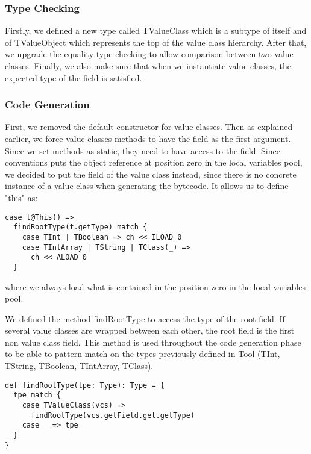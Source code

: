 \subsubsection{Type Checking}
Firstly, we defined a new type called TValueClass which is a subtype of itself and of TValueObject which represents the top of the value class hierarchy. \newline
After that, we upgrade the equality type checking to allow comparison between two value classes. \newline
Finally, we also make sure that when we instantiate value classes, the expected type of the field is satisfied. \newline

\subsubsection{Code Generation}
First, we removed the default constructor for value classes. 
Then as explained earlier, we force value classes methods to have the field as the first argument. 
Since we set methods as static, they need to have access to the field. \newline
Since conventions puts the object reference at position zero in the local variables pool, we decided to put the field of the value class instead, since there is no concrete instance of a value class when generating the bytecode. It allows us to define "this" as:
\begin{verbatim}
case t@This() =>
  findRootType(t.getType) match {
    case TInt | TBoolean => ch << ILOAD_0
    case TIntArray | TString | TClass(_) => 
      ch << ALOAD_0
  }
\end{verbatim}
where we always load what is contained in the position zero in the local variables pool.

We defined the method findRootType to access the type of the root field. 
If several value classes are wrapped between each other, the root field is the first non value class field. 
This method is used throughout the code generation phase to be able to pattern match on the types previously defined in Tool (TInt, TString, TBoolean, TIntArray, TClass).
\begin{verbatim}
def findRootType(tpe: Type): Type = {
  tpe match {
    case TValueClass(vcs) => 
      findRootType(vcs.getField.get.getType)
    case _ => tpe
  }
}
\end{verbatim}

